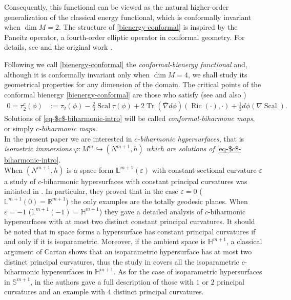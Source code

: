 \documentclass[11pt,leqno]{amsart}
\theoremstyle{plain}
\theoremstyle{definition}
\numberwithin{equation}{section}
\def \R{{\mathbb R}}
\newcommand{\Ric}{\operatorname{Ric}}
\newcommand{\Scal}{\operatorname{Scal}}
\DeclareMathOperator{\trace}{Tr}
\numberwithin{equation}{section}
\begin{document}
Consequently, this functional can be viewed as the natural higher-order generalization of the classical energy functional, which is conformally invariant when \(\dim M=2\). The structure of \eqref{bienergy-conformal} is inspired by the Paneitz operator, a fourth-order elliptic operator in conformal geometry. For details, see \cite[Chapter 4]{MR2521913} and the original work \cite{MR2393291}.

Following \cite{2501.08804, arXiv:2311.04493} we call \eqref{bienergy-conformal} the \emph{conformal-bienergy functional} and, although it is conformally invariant only when $\dim M=4$, we shall study its geometrical properties for any dimension of the domain.
The critical points of the conformal bienergy \eqref{bienergy-conformal} are those who satisfy (see  \cite{MR2722777} and also \cite{arXiv:2311.04493})
\begin{align}
\label{eq-$c$-biharmonic-intro}
0=\tau_2^c(\phi) & := \tau_2(\phi)-\frac{2}{3}\Scal\tau(\phi)+2\trace(\bar \nabla d\phi)(\Ric(\cdot),\cdot)+\frac{1}{3}d\phi(\nabla\Scal).
\end{align}
Solutions of \eqref{eq-$c$-biharmonic-intro} will be called \emph{conformal-biharmonc maps}, or simply 
\emph{$c$-biharmonic maps}.\\

In the present paper we are interested in \textit{$c$-biharmonic hypersurfaces}, that is \textit{isometric immersions} $\varphi: M^m\hookrightarrow (N^{m+1},h)$\textit{ which are solutions of} \eqref{eq-$c$-biharmonic-intro}. \\

When $(N^{m+1},h)$ is a space form ${\mathbb L}^{m+1}(\varepsilon)$ with constant sectional curvature $\varepsilon$ a study of $c$-biharmonic hypersurfaces with constant principal curvatures was initiated in \cite{arXiv:2311.04493}. In particular, they proved that in the case $\varepsilon=0$ (${\mathbb L}^{m+1}(0)=\R^{m+1}$) the only examples are the totally geodesic planes. When $\varepsilon=-1$ (${\mathbb L}^{m+1}(-1)={\mathbb H}^{m+1}$) they gave a detailed analysis of  $c$-biharmonic hypersurfaces with at most two distinct constant principal curvatures. It should be noted that in space forms a hypersurface has constant principal curvatures if and only if it is isoparametric. Moreover, if the ambient space is ${\mathbb H}^{m+1}$, a classical argument of Cartan \cite{MR1553310} shows that an isoparametric hypersurface has at most two distinct principal curvatures, thus the study in \cite{arXiv:2311.04493} covers all the isoparametric $c$-biharmonic  hypersurfaces in ${\mathbb H}^{m+1}$. As for the case of isoparametric hypersurfaces in ${\mathbb S}^{m+1}$, in \cite{arXiv:2311.04493} the authors gave a full description of those with $1$ or $2$ principal curvatures and an example with $4$ distinct principal curvatures.\\
\end{document}
